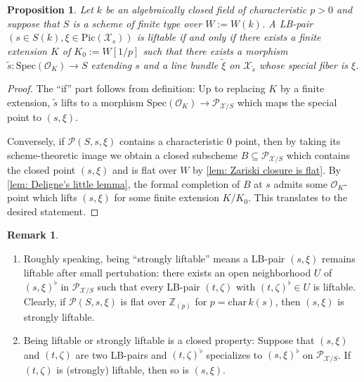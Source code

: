 \documentclass[letter, 11pt]{article}
\theoremstyle{plain}
\newtheorem{proposition}[subsubsection]{Proposition}
\theoremstyle{definition}
\newtheorem{remark}[subsubsection]{Remark}
\newcommand{\IZ}{\mathbb{Z}}
\newcommand{\Spec}{\mathrm{Spec}}
\newcommand{\<}{\langle}
\renewcommand{\>}{\rangle}
\def\wt{\widetilde}
\newcommand{\sX}{\mathcal{X}}
\newcommand{\sO}{\mathcal{O}}
\newcommand{\Pic}{\mathrm{Pic}}
\newcommand{\shP}{\mathscr{P}}
\begin{document}
\begin{proposition}
\label{prop: liftability}
    Let $k$ be an algebraically closed field of characteristic $p > 0$ and suppose that $S$ is a scheme of finite type over $W := W(k)$. A LB-pair $(s \in S(k), \xi \in \Pic(\sX_s))$ is liftable if and only if there exists a finite extension $K$ of $K_0 := W[1/p]$ such that there exists a morphism $\wt{s} : \Spec(\sO_K) \to S$ extending $s$ and a line bundle $\wt{\xi}$ on $\sX_{\wt{s}}$ whose special fiber is $\xi$.
\end{proposition} 
\begin{proof}
The ``if'' part follows from definition: Up to replacing $K$ by a finite extension, $\wt{s}$ lifts to a morphism $\Spec(\sO_K) \to \shP_{\sX/S}$ which maps the special point to $(s, \xi)$. 


Conversely, if $\shP(S, s, \xi)$ contains a characteristic $0$ point, then by taking its scheme-theoretic image we obtain a closed subscheme $B \subseteq \shP_{\sX/S}$ which contains the closed point $(s, \xi)$ and is flat over $W$ by \ref{lem: Zariski closure is flat}. By \ref{lem: Deligne's little lemma}, the formal completion of $B$ at $s$ admits some $\sO_K$-point which lifts $(s, \xi)$ for some finite extension $K/K_0$. This translates to the desired statement.  
\end{proof}


\begin{remark}
    \begin{enumerate}[label=\upshape{(\alph*)}]
        \item Roughly speaking, being ``strongly liftable'' means a LB-pair $(s, \xi)$ remains liftable after small pertubation: there exists an open neighborhood $U$ of $(s, \xi)^\flat$ in $\shP_{\sX/S}$ such that every LB-pair $(t, \zeta)$ with $(t, \zeta)^\flat \in U$ is liftable. Clearly, if $\shP(S, s, \xi)$ is flat over $\IZ_{(p)}$ for $p = \mathrm{char\,}k(s)$, then $(s, \xi)$ is strongly liftable. 
        \item Being liftable or strongly liftable is a closed property: Suppose that $(s, \xi)$ and $(t, \zeta)$ are two LB-pairs and $(t, \zeta)^\flat$ specializes to $(s, \xi)^\flat$ on $\shP_{\sX/S}$. If $(t, \zeta)$ is (strongly) liftable, then so is $(s, \xi)$. 
    \end{enumerate}
\end{remark}
\end{document}
